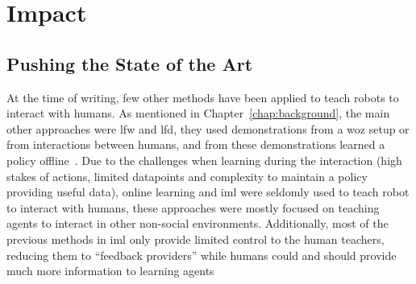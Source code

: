 
\section{Impact} \label{sec:disc_impact}

\subsection{Pushing the State of the Art}

At the time of writing, few other methods have been applied to teach robots to interact with humans. As mentioned in Chapter~\ref{chap:background}, the main other approaches were \gls{lfw} and \gls{lfd}, they used demonstrations from a \gls{woz} setup or from interactions between humans, and from these demonstrations learned a policy offline~\citep{knox2014learning,liu2014train,sequeira2016discovering}. Due to the challenges when learning during the interaction (high stakes of actions, limited datapoints and complexity to maintain a policy providing useful data), online learning and \gls{iml} were seldomly used to teach robot to interact with humans, these approaches were mostly focused on teaching agents to interact in other non-social environments. Additionally, most of the previous methods in \gls{iml} only provide limited control to the human teachers, reducing them to ``feedback providers'' while humans could and should provide much more information to learning agents~\citep{amershi2014power}
	
